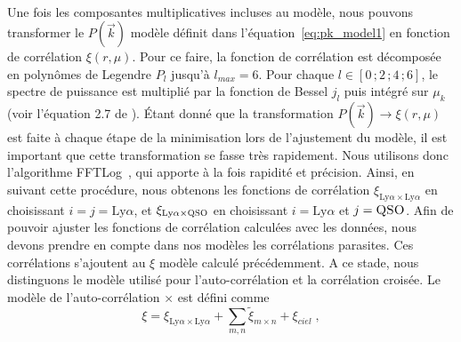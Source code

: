 \paragraph{}
Une fois les composantes multiplicatives incluses au modèle, nous pouvons transformer le $P(\vec k)$ modèle définit dans l'équation~\ref{eq:pk_model1} en fonction de corrélation $\xi(r, \mu)$.
Pour ce faire,
la fonction de corrélation est décomposée en polynômes de Legendre $P_l$ jusqu'à $l_{max} = 6$. Pour chaque $l \in [0 \, ; 2 \, ; 4\, ; 6]$,
le spectre de puissance est multiplié par la fonction de Bessel $j_l$ puis intégré sur $\mu_k$ (voir l'équation 2.7 de \textcite{Kirkby2013}).
Étant donné que la transformation $P(\vec k) \rightarrow \xi(r, \mu)$ est faite à chaque étape de la minimisation lors de l'ajustement du modèle, il est important que cette transformation se fasse très rapidement. Nous utilisons donc l'algorithme FFTLog~\autocite{Hamilton1999}, qui apporte à la fois rapidité et précision.
Ainsi, en suivant cette procédure, nous obtenons les fonctions de corrélation $\xi_{\mathrm{Ly}\alpha\times\mathrm{Ly}\alpha}$ en choisissant $i = j = \mathrm{Ly}\alpha$, et $\xi_{\mathrm{Ly}\alpha\times\textsc{QSO}}$ en choisissant $i = \mathrm{Ly}\alpha$ et $j = \textsc{QSO}$.
Afin de pouvoir ajuster les fonctions de corrélation calculées avec les données, nous devons prendre en compte dans nos modèles les corrélations parasites. Ces corrélations s'ajoutent au $\xi$ modèle calculé précédemment.
A ce stade, nous distinguons le modèle utilisé pour l'auto-corrélation et la corrélation croisée.
Le modèle de l'auto-corrélation \lya{}$\times$\lya{} est défini comme
\begin{equation}
  \label{eq:cf_model1}
  \xi = \xi_{\mathrm{Ly}\alpha\times\mathrm{Ly}\alpha}  + \sum_{m, n} \tilde \xi_{m\times n} + \xi_{ciel}  \; ,
\end{equation}
